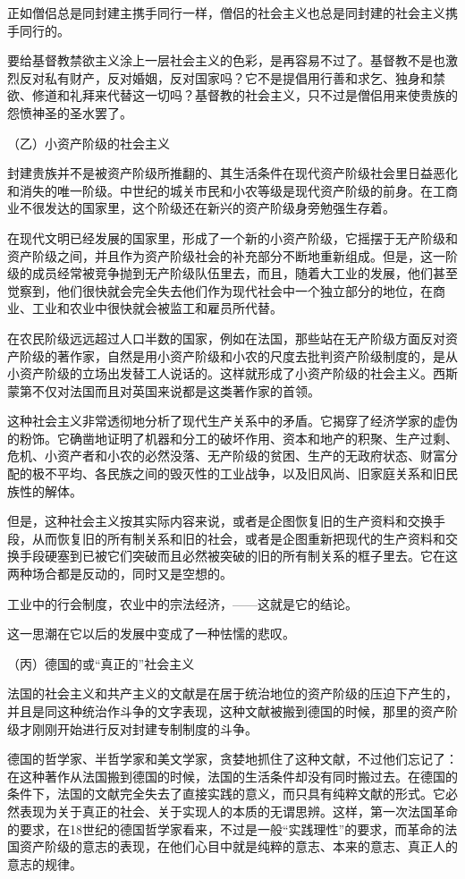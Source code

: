     正如僧侣总是同封建主携手同行一样，僧侣的社会主义也总是同封建的社会主义携手同行的。

    要给基督教禁欲主义涂上一层社会主义的色彩，是再容易不过了。基督教不是也激烈反对私有财产，反对婚姻，反对国家吗？它不是提倡用行善和求乞、独身和禁欲、修道和礼拜来代替这一切吗？基督教的社会主义，只不过是僧侣用来使贵族的怨愤神圣的圣水罢了。

    （乙）小资产阶级的社会主义

    封建贵族并不是被资产阶级所推翻的、其生活条件在现代资产阶级社会里日益恶化和消失的唯一阶级。中世纪的城关市民和小农等级是现代资产阶级的前身。在工商业不很发达的国家里，这个阶级还在新兴的资产阶级身旁勉强生存着。

    在现代文明已经发展的国家里，形成了一个新的小资产阶级，它摇摆于无产阶级和资产阶级之间，并且作为资产阶级社会的补充部分不断地重新组成。但是，这一阶级的成员经常被竞争抛到无产阶级队伍里去，而且，随着大工业的发展，他们甚至觉察到，他们很快就会完全失去他们作为现代社会中一个独立部分的地位，在商业、工业和农业中很快就会被监工和雇员所代替。

    在农民阶级远远超过人口半数的国家，例如在法国，那些站在无产阶级方面反对资产阶级的著作家，自然是用小资产阶级和小农的尺度去批判资产阶级制度的，是从小资产阶级的立场出发替工人说话的。这样就形成了小资产阶级的社会主义。西斯蒙第不仅对法国而且对英国来说都是这类著作家的首领。

    这种社会主义非常透彻地分析了现代生产关系中的矛盾。它揭穿了经济学家的虚伪的粉饰。它确凿地证明了机器和分工的破坏作用、资本和地产的积聚、生产过剩、危机、小资产者和小农的必然没落、无产阶级的贫困、生产的无政府状态、财富分配的极不平均、各民族之间的毁灭性的工业战争，以及旧风尚、旧家庭关系和旧民族性的解体。

    但是，这种社会主义按其实际内容来说，或者是企图恢复旧的生产资料和交换手段，从而恢复旧的所有制关系和旧的社会，或者是企图重新把现代的生产资料和交换手段硬塞到已被它们突破而且必然被突破的旧的所有制关系的框子里去。它在这两种场合都是反动的，同时又是空想的。

    工业中的行会制度，农业中的宗法经济，——这就是它的结论。

    这一思潮在它以后的发展中变成了一种怯懦的悲叹。

    （丙）德国的或“真正的”社会主义

    法国的社会主义和共产主义的文献是在居于统治地位的资产阶级的压迫下产生的，并且是同这种统治作斗争的文字表现，这种文献被搬到德国的时候，那里的资产阶级才刚刚开始进行反对封建专制制度的斗争。

    德国的哲学家、半哲学家和美文学家，贪婪地抓住了这种文献，不过他们忘记了：在这种著作从法国搬到德国的时候，法国的生活条件却没有同时搬过去。在德国的条件下，法国的文献完全失去了直接实践的意义，而只具有纯粹文献的形式。它必然表现为关于真正的社会、关于实现人的本质的无谓思辨。这样，第一次法国革命的要求，在18世纪的德国哲学家看来，不过是一般“实践理性”的要求，而革命的法国资产阶级的意志的表现，在他们心目中就是纯粹的意志、本来的意志、真正人的意志的规律。

